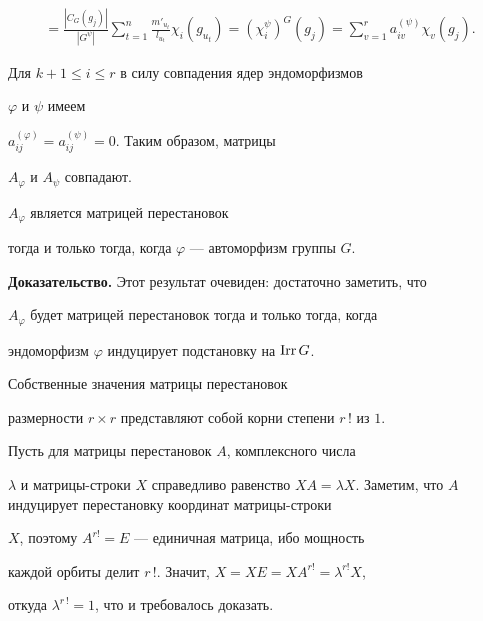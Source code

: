\begin{pf}
\begin{multline*}
%


=\frac{|C_{G}(g_{j})|}{|G^{\psi}|} \sum\limits^{n}_{t=1}


\frac{m'_{u_{t}}}{l_{u_{t}}} \chi_{i}(g_{u_{t}})=


(\chi^{\psi}_{i})^{G}(g_{j})=


\sum\limits^{r}_{v=1}a^{(\psi)}_{iv}\chi_{v}(g_{j}).


\end{multline*}





Для $k+1\le i\le r$ в силу совпадения ядер эндоморфизмов


$\varphi$ и $\psi$ имеем


$a^{(\varphi)}_{ij}=a^{(\psi)}_{ij}=0$. Таким образом, матрицы


$A_{\varphi}$ и $A_{\psi}$ совпадают.


\end{pf}





\begin{lem}\label{monom}


$A_{\varphi}$ является матрицей перестановок


тогда и только тогда, когда $\varphi$ --- автоморфизм группы $G$.


\end{lem}





{\bf Доказательство.} Этот результат очевиден: достаточно заметить, что


$A_{\varphi}$ будет матрицей перестановок тогда и только тогда, когда


эндоморфизм $\varphi$ индуцирует подстановку на $\operatorname{Irr} G$.





\begin{lem}\label{sobzn}


Собственные значения матрицы перестановок


размерности $r\times r$ представляют собой корни степени $r\,!$ из $1$.


\end{lem}





\begin{pf} Пусть для матрицы перестановок $A$, комплексного числа


$\lambda$ и матрицы-строки $X$ справедливо равенство $XA=\lambda


X$. Заметим, что $A$ индуцирует перестановку координат матрицы-строки


$X$, поэтому $A^{r!}=E$ --- единичная матрица, ибо мощность


каждой орбиты делит $r\,!$. Значит, $X=XE=XA^{r!}=\lambda^{r!}X$,


откуда $\lambda^{r\,!}=1$, что и требовалось доказать.


\end{pf}





